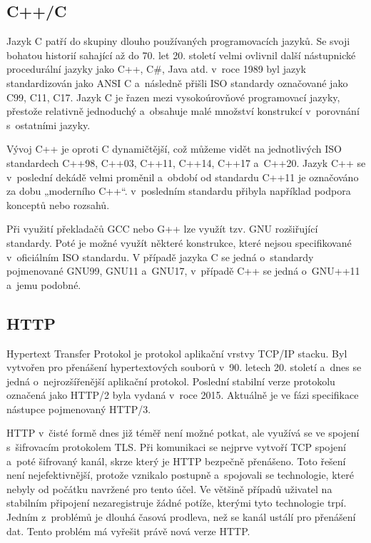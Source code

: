\subsection{C++/C}

Jazyk C patří do skupiny dlouho používaných programovacích jazyků. Se svoji bohatou historií sahající až do 70. let 20. století velmi ovlivnil další nástupnické procedurální
jazyky jako C++, C\#, Java atd. v roce 1989 byl jazyk standardizován jako ANSI C a následně přišli ISO standardy označované jako C99, C11, C17. Jazyk C je řazen mezi
vysokoúrovňové programovací jazyky, přestože relativně jednoduchý a obsahuje malé množství konstrukcí v porovnání s ostatními jazyky.\cite{CReference}

Vývoj C++ je oproti C dynamičtější, což můžeme vidět na jednotlivých ISO standardech C++98, C++03, C++11, C++14, C++17 a C++20. Jazyk C++ se v poslední dekádě velmi
proměnil a období od standardu C++11 je označováno za dobu „moderního C++“. v posledním standardu přibyla například podpora konceptů nebo rozsahů.\cite{CPPReference}

Při využití překladačů GCC nebo G++ lze využít tzv. GNU rozšiřující standardy. Poté je možné využít některé konstrukce, které nejsou specifikované v oficiálním ISO standardu.
V případě jazyka C se jedná o standardy pojmenované GNU99, GNU11 a GNU17, v případě C++ se jedná o GNU++11 a jemu podobné.

\subsection{HTTP}

Hypertext Transfer Protokol je protokol aplikační vrstvy TCP/IP stacku. Byl vytvořen pro přenášení hypertextových souborů v 90. letech 20. století a dnes se jedná o nejrozšířenější
aplikační protokol. Poslední stabilní verze protokolu označená jako HTTP/2 byla vydaná v roce 2015. Aktuálně je ve fázi specifikace nástupce pojmenovaný HTTP/3.

HTTP v čisté formě dnes již téměř není možné potkat, ale využívá se ve spojení s šifrovacím protokolem TLS. Při komunikaci se nejprve vytvoří TCP spojení a poté šifrovaný kanál,
skrze který je HTTP bezpečně přenášeno. Toto řešení není nejefektivnější, protože vznikalo postupně a spojovali se technologie, které nebyly od počátku navržené pro tento účel.
Ve většině případů uživatel na stabilním připojení nezaregistruje žádné potíže, kterými tyto technologie trpí. Jedním z problémů je dlouhá časová prodleva, než se kanál ustálí
pro přenášení dat. Tento problém má vyřešit právě nová verze HTTP. \cite{HTTP3}

